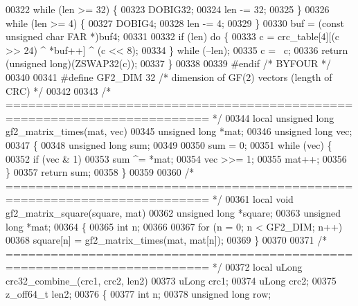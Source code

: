\begin{DoxyCode}
{00322     \textcolor{keywordflow}{while} (len >= 32) \{
00323         DOBIG32;
00324         len -= 32;
00325     \}
00326     \textcolor{keywordflow}{while} (len >= 4) \{
00327         DOBIG4;
00328         len -= 4;
00329     \}
00330     buf = (\textcolor{keyword}{const} \textcolor{keywordtype}{unsigned} \textcolor{keywordtype}{char} FAR *)buf4;
00331 
00332     \textcolor{keywordflow}{if} (len) \textcolor{keywordflow}{do} \{
00333         c = crc\_table[4][(c >> 24) ^ *buf++] ^ (c << 8);
00334     \} \textcolor{keywordflow}{while} (--len);
00335     c = ~c;
00336     \textcolor{keywordflow}{return} (\textcolor{keywordtype}{unsigned} \textcolor{keywordtype}{long})(ZSWAP32(c));
00337 \}
00338 
00339 \textcolor{preprocessor}{#endif }\textcolor{comment}{/* BYFOUR */}\textcolor{preprocessor}{}
00340 
00341 \textcolor{preprocessor}{#define GF2\_DIM 32      }\textcolor{comment}{/* dimension of GF(2) vectors (length of CRC) */}\textcolor{preprocessor}{}
00342 
00343 \textcolor{comment}{/* ========================================================================= */}
00344 local \textcolor{keywordtype}{unsigned} \textcolor{keywordtype}{long} gf2\_matrix\_times(mat, vec)
00345     \textcolor{keywordtype}{unsigned} \textcolor{keywordtype}{long} *mat;
00346     \textcolor{keywordtype}{unsigned} \textcolor{keywordtype}{long} vec;
00347 \{
00348     \textcolor{keywordtype}{unsigned} \textcolor{keywordtype}{long} sum;
00349 
00350     sum = 0;
00351     \textcolor{keywordflow}{while} (vec) \{
00352         \textcolor{keywordflow}{if} (vec & 1)
00353             sum ^= *mat;
00354         vec >>= 1;
00355         mat++;
00356     \}
00357     \textcolor{keywordflow}{return} sum;
00358 \}
00359 
00360 \textcolor{comment}{/* ========================================================================= */}
00361 local \textcolor{keywordtype}{void} gf2\_matrix\_square(square, mat)
00362     \textcolor{keywordtype}{unsigned} \textcolor{keywordtype}{long} *square;
00363     \textcolor{keywordtype}{unsigned} \textcolor{keywordtype}{long} *mat;
00364 \{
00365     \textcolor{keywordtype}{int} n;
00366 
00367     \textcolor{keywordflow}{for} (n = 0; n < GF2\_DIM; n++)
00368         square[n] = gf2\_matrix\_times(mat, mat[n]);
00369 \}
00370 
00371 \textcolor{comment}{/* ========================================================================= */}
00372 local uLong crc32\_combine\_(crc1, crc2, len2)
00373     uLong crc1;
00374     uLong crc2;
00375     z\_off64\_t len2;
00376 \{
00377     \textcolor{keywordtype}{int} n;
00378     \textcolor{keywordtype}{unsigned} \textcolor{keywordtype}{long} row;
}
\end{DoxyCode}
